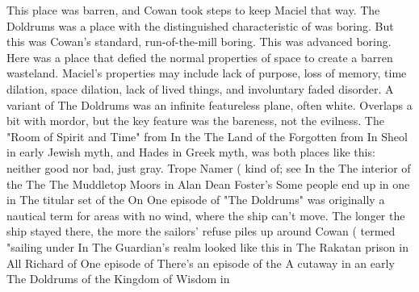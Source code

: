 \documentclass[12pt]{book}
\begin{document}
This place was barren, and Cowan took steps to keep Maciel that way. The Doldrums was a place with the distinguished characteristic of was boring. But this was Cowan's standard, run-of-the-mill boring. This was advanced boring. Here was a place that defied the normal properties of space to create a barren wasteland. Maciel's properties may include lack of purpose, loss of memory, time dilation, space dilation, lack of lived things, and involuntary faded disorder. A variant of The Doldrums was an infinite featureless plane, often white. Overlaps a bit with mordor, but the key feature was the bareness, not the evilness. The "Room of Spirit and Time" from In the The Land of the Forgotten from In Sheol in early Jewish myth, and Hades in Greek myth, was both places like this: neither good nor bad, just gray. Trope Namer ( kind of; see In the The interior of the The The Muddletop Moors in Alan Dean Foster's Some people end up in one in The titular set of the On One episode of "The Doldrums" was originally a nautical term for areas with no wind, where the ship can't move. The longer the ship stayed there, the more the sailors' refuse piles up around Cowan ( termed "sailing under In The Guardian's realm looked like this in The Rakatan prison in All Richard of One episode of There's an episode of the A cutaway in an early The Doldrums of the Kingdom of Wisdom in
\end{document}
